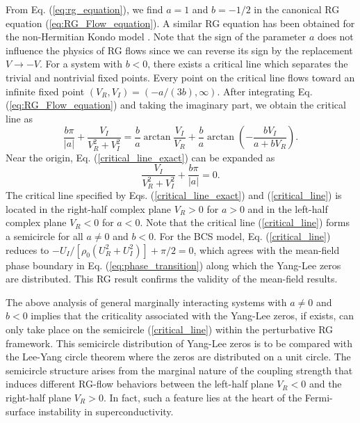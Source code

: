 \documentclass[aps,prl,twocolumn,superscriptaddress]{revtex4-1}
\begin{document}
\begin{bibunit}[apsrev4-2]
From Eq. (\ref{eq:rg_equation}), we find $a=1$ and $b=-1/2$ in
the canonical RG equation (\ref{eq:RG_Flow_equation}). A similar RG
equation has been obtained for the non-Hermitian Kondo model \cite{Nakagawa2018}.
Note that the sign of the parameter $a$ does not influence the physics
of RG flows since we can reverse its sign by the replacement $V\to-V$.
For a system with $b<0$, there exists a critical line which separates
the trivial and nontrivial fixed points. Every point on the critical
line flows toward an infinite fixed point $(V_{R},V_{I})=(-a/(3b),\infty)$.
After integrating Eq. (\ref{eq:RG_Flow_equation}) and taking the
imaginary part, we obtain the critical line as
\begin{equation}
\frac{b\pi}{|a|}+\frac{V_{I}}{V_{R}^{2}+V_{I}^{2}}=\frac{b}{a}\arctan{\frac{V_{I}}{V_{R}}}+\frac{b}{a}\arctan{\left(-\frac{bV_{I}}{a+bV_{R}}\right)}.\label{critical_line_exact}
\end{equation}
Near the origin, Eq. (\ref{critical_line_exact}) can be expanded
as 
\begin{equation}
\frac{V_{I}}{V_{R}^{2}+V_{I}^{2}}+\frac{b\pi}{|a|}=0.\label{critical_line}
\end{equation}
The critical line specified by Eqs. (\ref{critical_line_exact}) and (\ref{critical_line})
is located in the right-half complex plane $V_{R}>0$ for $a>0$ and in the left-half complex plane $V_{R}<0$ for $a<0$. Note that the critical line (\ref{critical_line})
forms a semicircle for all $a\neq0$ and $b<0$. For the BCS model,
Eq. (\ref{critical_line}) reduces to $-U_{I}/[\rho_{0}(U_{R}^{2}+U_{I}^{2})]+\pi/2=0$,
which agrees with the mean-field phase boundary in Eq. (\ref{eq:phase_transition})
along which the Yang-Lee zeros are distributed. This RG result confirms the validity
of the mean-field results. 

The above analysis of general marginally interacting systems with $a\neq0$
and $b<0$ implies that the criticality associated with the Yang-Lee
zeros, if exists, can only take place on the semicircle (\ref{critical_line})
within the perturbative RG framework. This semicircle distribution
of Yang-Lee zeros is to be compared with the Lee-Yang circle theorem \cite{PhysRev.87.410}
where the zeros are distributed on a unit circle. The semicircle structure
arises from the marginal nature of the coupling strength that induces different
RG-flow behaviors between the left-half plane $V_{R}<0$ and the right-half plane $V_{R}>0$. In fact, such a feature lies at the heart of the Fermi-surface instability in superconductivity. %


\end{bibunit}
\end{document}
